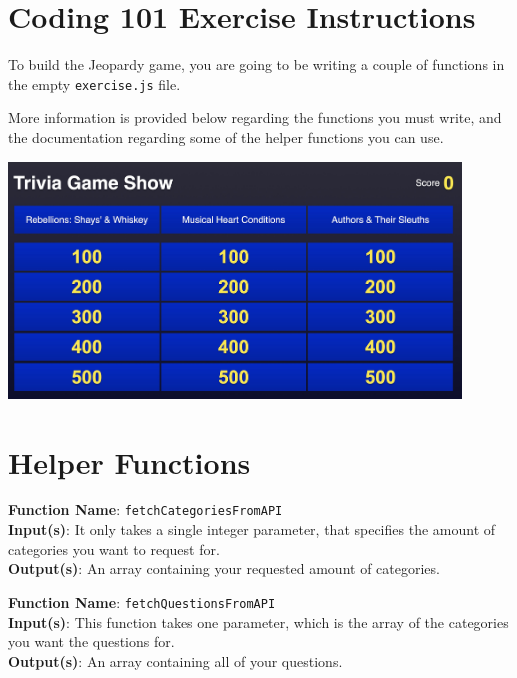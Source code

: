 \documentclass{article}
\begin{document}
    \section*{Coding 101 Exercise Instructions}
        To build the Jeopardy game, you are going to be writing a couple of functions in the empty \texttt{exercise.js} file. 
         
        More information is provided below regarding the functions you must write, and the documentation regarding some of the helper functions you can use.

        \vspace{5mm}

        \begin{center}
            \includegraphics[width=120mm]{jeopardy.jpg}
        \end{center}

    \vspace{5mm}

    \section*{Helper Functions}
        \textbf{Function Name}: \texttt{fetchCategoriesFromAPI} \\
        \textbf{Input(s)}: It only takes a single integer parameter, that specifies the amount of categories you want to request for. \\
        \textbf{Output(s)}: An array containing your requested amount of categories.

        \vspace{3mm}

        \textbf{Function Name}: \texttt{fetchQuestionsFromAPI} \\
        \textbf{Input(s)}: This function takes one parameter, which is the array of the categories you want the questions for. \\
        \textbf{Output(s)}: An array containing all of your questions.
        
\end{document}
